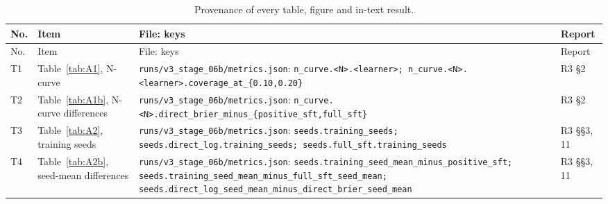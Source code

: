 \documentclass[10pt,letterpaper]{article}
\theoremstyle{plain}
\begin{document}
{\footnotesize
\setlength{\tabcolsep}{4pt}
\begin{longtable}{@{}p{}>{\raggedright\arraybackslash}p{}>{\raggedright\arraybackslash}p{}>{\raggedright\arraybackslash}p{}@{}}
\caption{Provenance of every table, figure and in-text result.}\label{tab:prov}\\
\toprule
No. & Item & File: keys & Report \\
\midrule
\endfirsthead
\toprule
No. & Item & File: keys & Report \\
\midrule
\endhead
\bottomrule
\endfoot
T1 & Table~\ref{tab:A1}, N-curve & \texttt{runs/\allowbreak{}v3\_\allowbreak{}stage\_\allowbreak{}06b/\allowbreak{}metrics.\allowbreak{}json}: \texttt{n\_\allowbreak{}curve.\allowbreak{}\textless{}N\textgreater{}.\allowbreak{}\textless{}learner\textgreater{};\allowbreak{} n\_\allowbreak{}curve.\allowbreak{}\textless{}N\textgreater{}.\allowbreak{}\textless{}learner\textgreater{}.\allowbreak{}coverage\_\allowbreak{}at\_\allowbreak{}\{0.\allowbreak{}10,0.\allowbreak{}20\}} & R3 \S2 \\
T2 & Table~\ref{tab:A1b}, N-curve differences & \texttt{runs/\allowbreak{}v3\_\allowbreak{}stage\_\allowbreak{}06b/\allowbreak{}metrics.\allowbreak{}json}: \texttt{n\_\allowbreak{}curve.\allowbreak{}\textless{}N\textgreater{}.\allowbreak{}direct\_\allowbreak{}brier\_\allowbreak{}minus\_\allowbreak{}\{positive\_\allowbreak{}sft,full\_\allowbreak{}sft\}} & R3 \S2 \\
T3 & Table~\ref{tab:A2}, training seeds & \texttt{runs/\allowbreak{}v3\_\allowbreak{}stage\_\allowbreak{}06b/\allowbreak{}metrics.\allowbreak{}json}: \texttt{seeds.\allowbreak{}training\_\allowbreak{}seeds;\allowbreak{} seeds.\allowbreak{}direct\_\allowbreak{}log.\allowbreak{}training\_\allowbreak{}seeds;\allowbreak{} seeds.\allowbreak{}full\_\allowbreak{}sft.\allowbreak{}training\_\allowbreak{}seeds} & R3 \S\S3, 11 \\
T4 & Table~\ref{tab:A2b}, seed-mean differences & \texttt{runs/\allowbreak{}v3\_\allowbreak{}stage\_\allowbreak{}06b/\allowbreak{}metrics.\allowbreak{}json}: \texttt{seeds.\allowbreak{}training\_\allowbreak{}seed\_\allowbreak{}mean\_\allowbreak{}minus\_\allowbreak{}positive\_\allowbreak{}sft;\allowbreak{} seeds.\allowbreak{}training\_\allowbreak{}seed\_\allowbreak{}mean\_\allowbreak{}minus\_\allowbreak{}full\_\allowbreak{}sft\_\allowbreak{}seed\_\allowbreak{}mean;\allowbreak{} seeds.\allowbreak{}direct\_\allowbreak{}log\_\allowbreak{}seed\_\allowbreak{}mean\_\allowbreak{}minus\_\allowbreak{}direct\_\allowbreak{}brier\_\allowbreak{}seed\_\allowbreak{}mean} & R3 \S\S3, 11 \\

\end{longtable}}
\end{document}
